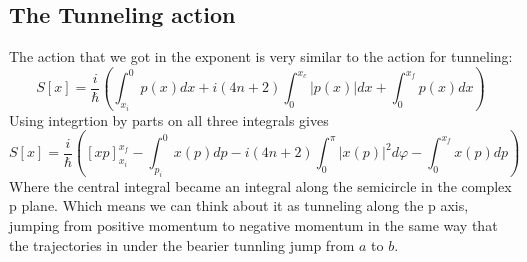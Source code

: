 \documentclass{article}
\begin{document}
\subsection{The Tunneling action}
The action that we got in the exponent is very similar to the action for tunneling:
\begin{equation}
    S[x] = \frac{i}{\hbar}\left(
        \int_{x_i}^{0}p(x)dx +
        i (4n + 2) \int_{0}^{x_c}|p(x)|dx + 
        \int_{0}^{x_f}p(x)dx
    \right)
\end{equation}
Using integrtion by parts on all three integrals gives
\begin{equation}
    S[x] = \frac{i}{\hbar}\left(
        \left[xp\right]_{x_i}^{x_f} -
        \int_{p_i}^{0}x(p)dp -
        i (4n + 2) \int_{0}^{\pi}|x(p)|^2d\varphi - 
        \int_{0}^{x_f}x(p)dp
    \right)
\end{equation}
Where the central integral became an integral along the semicircle in the complex p plane. Which means we can think about it as tunneling along the p axis, jumping from positive momentum to negative momentum in the same way that the trajectories in under the bearier tunnling jump from $a$ to $b$.
\end{document}
